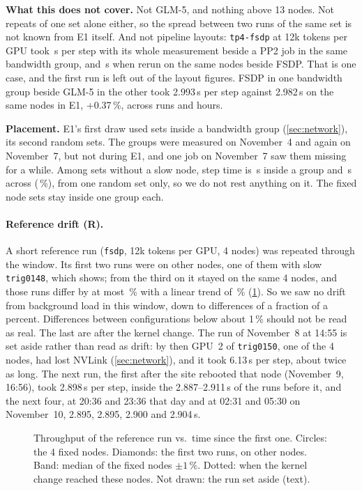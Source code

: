 \textbf{What this does not cover.} Not GLM-5, and nothing above 13 nodes. Not repeats of one set alone either, so the spread between two runs of the same set is not known from E1 itself. And not pipeline layouts: \texttt{tp4-fsdp} at 12k tokens per GPU took \TriBesidePPSlow\,s per step with its whole measurement beside a PP2 job in the same bandwidth group, and \TriBesidePPFast\,s when rerun on the same nodes beside FSDP. That is one case, and the first run is left out of the layout figures. FSDP in one bandwidth group beside GLM-5 in the other took 2.993\,s per step against 2.982\,s on the same nodes in E1, +0.37\,\%, across runs and hours.

\textbf{Placement.} E1's first draw used sets inside a bandwidth group (\cref{sec:network}), its second random sets. The groups were measured on November~4 and again on November~7, but not during E1, and one job on November~7 saw them missing for a while. Among sets without a slow node, step time is \TriPlacementGroup\,s inside a group and \TriPlacementRandom\,s across (\TriPlacementPct\,\%), from one random set only, so we do not rest anything on it. The fixed node sets stay inside one group each.

\paragraph{Reference drift (R).} A short reference run (\texttt{fsdp}, 12k tokens per GPU, 4 nodes) was repeated through the window. Its first two runs were on other nodes, one of them with slow \texttt{trig0148}, which shows; from the third on it stayed on the same 4 nodes, and those runs differ by at most \TriRefSpreadPct\,\% with a linear trend of \TriDriftPct\,\% (\cref{fig:reference_drift}). So we saw no drift from background load in this window, down to differences of a fraction of a percent. Differences between configurations below about 1\,\% should not be read as real. The last \TriRefAfter{} are after the kernel change. The run of November~8 at 14:55 is set aside rather than read as drift: by then GPU~2 of \texttt{trig0150}, one of the 4 nodes, had lost NVLink (\cref{sec:network}), and it took 6.13\,s per step, about twice as long. The next run, the first after the site rebooted that node (November~9, 16:56), took 2.898\,s per step, inside the 2.887--2.911\,s of the runs before it, and the next four, at 20:36 and 23:36 that day and at 02:31 and 05:30 on November~10, 2.895, 2.895, 2.900 and 2.904\,s.

\begin{figure}[h]
  \centering{}
  \caption{Throughput of the reference run vs.\ time since the first one. Circles: the 4 fixed nodes. Diamonds: the first two runs, on other nodes. Band: median of the fixed nodes $\pm1\,\%$. Dotted: when the kernel change reached these nodes. Not drawn: the run set aside (text). }
  \label{fig:reference_drift}
\end{figure}
